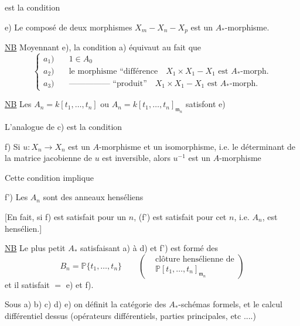 est la condition

e) Le composé de deux morphismes $X_m-X_n-X_p$ est un $A_*$-morphisme.


\uline{NB} Moyennant  e), la condition a) équivaut au fait que
\[
\left\{\begin{aligned}
 a_1)&\quad 1\in A_0\\
 a_2)&\quad \text{le morphisme ``différence}\quad X_1\times X_1-X_1\text{ est } A_*\text{-morph.}\\
 a_3)&\quad \text{--------------- ``produit''}\quad X_1\times X_1-X_1\text{ est } A_*\text{-morph.}
\end{aligned}\right.
\]

\uline{NB} Les $A_n=k[t_1,\ldots,t_n]$ ou $A_n=k[t_1,\ldots,t_n]_{\mathfrak m_n}$ satisfont e)

L'analogue de c) est la condition

f) Si $u:X_n\longrightarrow X_n$ est un $A$-morphisme et un isomorphisme,  i.e. le déterminant  de la matrice jacobienne de $u$ est inversible, alors $u^{-1}$ est un $A$-morphisme

Cette condition implique 


f') Les $A_n$ sont des anneaux henséliens

[En fait, si f) est satisfait pour un $n$, (f') est satisfait pour cet $n$, i.e. $A_n$, est hensélien.]



\uline{NB} Le plus petit $A_*$ satisfaisant a) à d) et f') est formé des
\[
 B_n=\mathbb P\{t_1,\ldots,t_n\}\qquad
 \left(\begin{aligned}&\text{clôture hensélienne de}\\[-2pt]&\mathbb P[t_1,\ldots,t_n]_{\mathfrak m_n}\end{aligned}\right)
\]
et il satisfait $=$ e) et f).


Sous a) b) c) d) e) on définit la catégorie des $A_*$-schémas formels, et le calcul différentiel dessus (opérateurs différentiels, parties principales,  etc ....)


